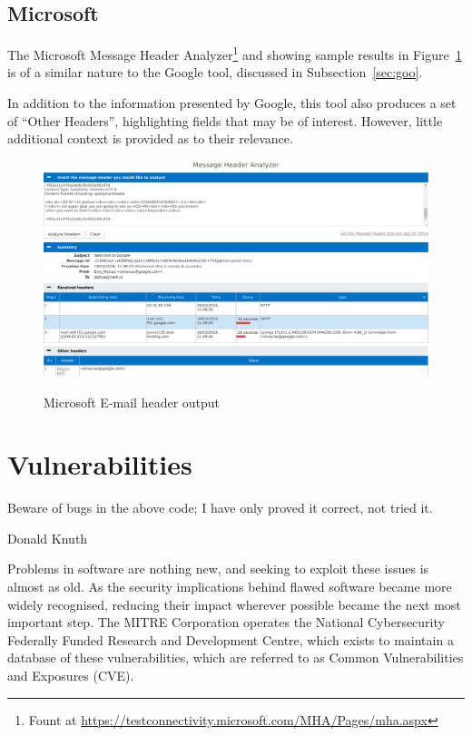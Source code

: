 \subsection{Microsoft}

The Microsoft Message Header Analyzer\footnote{Fount at
	\url{https://testconnectivity.microsoft.com/MHA/Pages/mha.aspx}} and
showing sample results in Figure~\ref{fig:mic} is of a similar nature to the Google tool, discussed in Subsection~\ref{sec:goo}.  

In addition to the information presented by Google, this tool also produces a set of ``Other Headers'', highlighting fields that may be of interest.  However, little additional context is provided as to their relevance.

\begin{figure}
\begin{framed}
	\centering \includegraphics[width=0.9\linewidth]{microsoft-header}\label{fig:mic}
\end{framed}
\caption{Microsoft E-mail header output} \end{figure}

\section{Vulnerabilities}

\epigraph{Beware of bugs in the above code; I have only proved it correct, not tried it.}{Donald Knuth}

Problems in software are nothing new, and seeking to exploit these issues is
almost as old.   As the security implications behind flawed software became more
widely recognised, reducing their impact wherever possible became the next most
important step.  The MITRE Corporation operates the National Cybersecurity
Federally Funded Research and Development Centre, which exists to maintain a
database of these vulnerabilities, which are referred to as Common
Vulnerabilities and Exposures (CVE).

